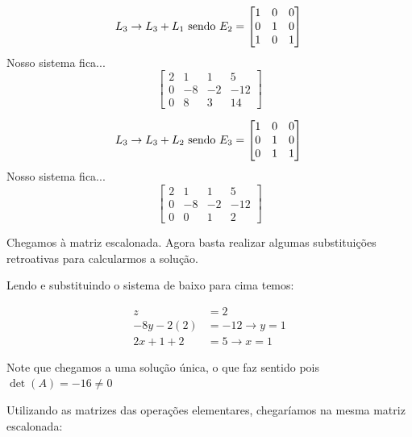 \documentclass[12pt]{article}
\begin{document}
	
	\begin{equation*}
		L_3 \rightarrow L_3 +L_1 \mbox{ sendo } 
		E_2=\begin{bmatrix}
			1 & 0 &0\\
			0 & 1 & 0\\
			1 & 0 & 1
		\end{bmatrix}\\
	\end{equation*}
	Nosso sistema fica...
	\begin{equation*}
		\begin{bmatrix}
			2 & 1 & 1 & 5\\
			0 & -8 & -2 & -12\\
			0 & 8 & 3 & 14
		\end{bmatrix}
	\end{equation*}
	
	
	\begin{equation*}
		L_3 \rightarrow L_3 +L_2 \mbox{ sendo } 
		E_3=\begin{bmatrix}
			1 & 0 &0\\
			0 & 1 & 0\\
			0 & 1 & 1
		\end{bmatrix}\\
	\end{equation*}
	Nosso sistema fica...
	\begin{equation*}
		\begin{bmatrix}
			2 & 1 & 1 & 5\\
			0 & -8 & -2 & -12\\
			0 & 0 & 1 & 2
		\end{bmatrix}
	\end{equation*}
	
	Chegamos à matriz escalonada. Agora basta realizar algumas substituições retroativas para calcularmos a solução.
	
	Lendo e substituindo o sistema de baixo para cima temos:
	
	\begin{align*}
		z&=2 \\
		-8y-2(2)&=-12 \rightarrow y=1 \\
		2x+1+2&=5 \rightarrow x=1	
	\end{align*}
	
	Note que chegamos a uma solução única, o que faz sentido pois $\det(A)=-16\neq0$
	
	Utilizando as matrizes das operações elementares, chegaríamos na mesma matriz escalonada:
	
\end{document}
